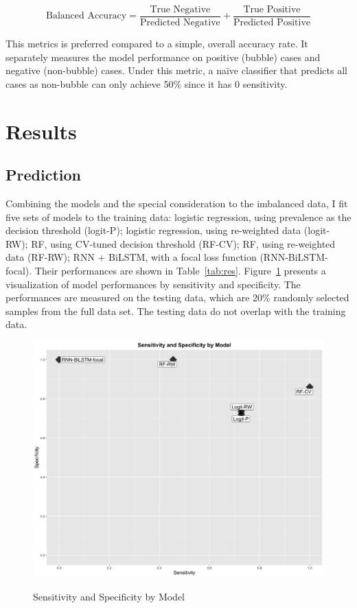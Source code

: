 \documentclass[12pt, man, a4paper, floatsintext]{apa7}
\begin{document}
\begin{equation}
    \text{Balanced Accuracy} = \frac{\text{True Negative}}{\text{Predicted Negative}} + 
                               \frac{\text{True Positive}}{\text{Predicted Positive}}
    \label{eq:ba}
\end{equation}

This metrics is preferred compared to a simple, overall accuracy rate. It separately measures the model performance on positive (bubble) cases and negative (non-bubble) cases. Under this metric, a naïve classifier that predicts all cases as non-bubble can only achieve 50\% since it has 0 sensitivity.


\section{Results}

\subsection{Prediction}

Combining the models and the special consideration to the imbalanced data, I fit five sets of models to the training data: logistic regression, using prevalence as the decision threshold (logit-P); logistic regression, using re-weighted data (logit-RW); RF, using CV-tuned decision threshold (RF-CV); RF, using re-weighted data (RF-RW); RNN + BiLSTM, with a focal loss function (RNN-BiLSTM-focal). Their performances are shown in Table~\ref{tab:res}. Figure~\ref{fig:res} presents a visualization of model performances by sensitivity and specificity. The performances are measured on the testing data, which are 20\% randomly selected samples from the full data set. The testing data do not overlap with the training data.





\begin{figure}
    \centering
    \caption{Sensitivity and Specificity by Model}
    \includegraphics[width=15cm]{res.png}
    \label{fig:res}
\end{figure}
\end{document}
